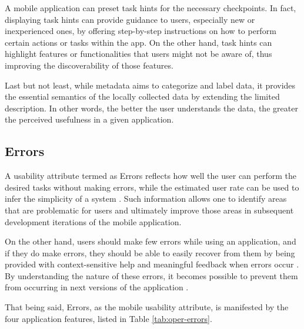 \documentclass[preprint,12pt]{elsarticle}
\begin{document}
A mobile application can preset task hints for the necessary checkpoints. In fact, displaying task hints can provide guidance to users, especially new or inexperienced ones, by offering step-by-step instructions on how to perform certain actions or tasks within the app. On the other hand, task hints can highlight features or functionalities that users might not be aware of, thus improving the discoverability of those features.

Last but not least, while metadata aims to categorize and label data, it provides the essential semantics of the locally collected data by extending the limited description. In other words, the better the user understands the data, the greater the perceived usefulness in a given application.

\subsection{Errors}
A usability attribute termed as Errors reflects how well the user can perform the desired tasks without making errors, while the estimated user rate can be used to infer the simplicity of a system \cite{harrison2013usability}. Such information allows one to identify areas that are problematic for users and ultimately improve those areas in subsequent development iterations of the mobile application. 

On the other hand, users should make few errors while using an application, and if they do make errors, they should be able to easily recover from them \cite{ali2022mobile} by being provided with context-sensitive help and meaningful feedback when errors occur \cite{seffah2006usability}. By understanding the nature of these errors, it becomes possible to prevent them from occurring in next versions of the application \cite{parsazadeh2018framework}. 

That being said, Errors, as the mobile usability attribute, is manifested by the four application features, listed in Table \ref{tab:oper-errors}. 
\end{document}
